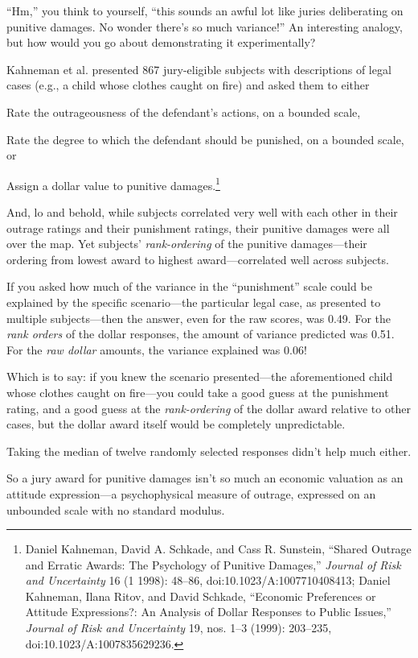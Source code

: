 {
 ``Hm,'' you think to yourself,
``this sounds an awful lot like juries deliberating on
punitive damages. No wonder there's so much
variance!'' An interesting analogy, but how would you
go about demonstrating it experimentally?}

{
 Kahneman et al. presented 867 jury-eligible subjects with
descriptions of legal cases (e.g., a child whose clothes caught on
fire) and asked them to either}

{
 Rate the outrageousness of the defendant's
actions, on a bounded scale,}

{
 Rate the degree to which the defendant should be punished, on a
bounded scale, or}

{
 Assign a dollar value to punitive damages.\footnote{Daniel Kahneman, David A. Schkade, and Cass R. Sunstein,
``Shared Outrage and Erratic Awards: The Psychology of
Punitive Damages,'' \textit{Journal of Risk and
Uncertainty} 16 (1 1998): 48--86, doi:10.1023/A:1007710408413; Daniel
Kahneman, Ilana Ritov, and David Schkade, ``Economic
Preferences or Attitude Expressions?: An Analysis of Dollar Responses
to Public Issues,'' \textit{Journal of Risk and
Uncertainty} 19, nos. 1--3 (1999): 203--235,
doi:10.1023/A:1007835629236.}}

{
 And, lo and behold, while subjects correlated very well with each
other in their outrage ratings and their punishment ratings, their
punitive damages were all over the map. Yet subjects'
\textit{rank-ordering} of the punitive damages---their ordering from
lowest award to highest award---correlated well across subjects.}

{
 If you asked how much of the variance in the
``punishment'' scale could be
explained by the specific scenario---the particular legal case, as
presented to multiple subjects---then the answer, even for the raw
scores, was 0.49. For the \textit{rank orders} of the dollar responses,
the amount of variance predicted was 0.51. For the \textit{raw dollar}
amounts, the variance explained was 0.06!}

{
 Which is to say: if you knew the scenario presented---the
aforementioned child whose clothes caught on fire---you could take a
good guess at the punishment rating, and a good guess at the
\textit{rank-ordering} of the dollar award relative to other cases, but
the dollar award itself would be completely unpredictable.}

{
 Taking the median of twelve randomly selected responses
didn't help much either.}

{
 So a jury award for punitive damages isn't so much
an economic valuation as an attitude expression---a psychophysical
measure of outrage, expressed on an unbounded scale with no standard
modulus.}

